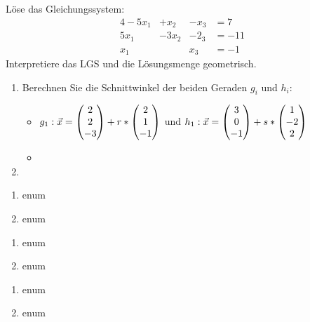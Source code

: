Löse das Gleichungssystem:
\begin{alignat*}{4}
	-5x_1& +x_2& -x_3& = 7\\
	5x_1&  -3x_2& -2_3& = -11\\
	x_1& & x_3& =-1
\end{alignat*}
Interpretiere das LGS und die Lösungsmenge geometrisch.



\begin{enumerate}
	\item Berechnen Sie die Schnittwinkel der beiden Geraden $g_i$ und $h_i$:
	\begin{itemize}
		\item $g_1: \vec x = \begin{pmatrix} 2\\2\\-3 \end{pmatrix} + r*\begin{pmatrix} 2\\1\\-1 \end{pmatrix}$ und $h_1: \vec x = \begin{pmatrix} 3\\0\\-1 \end{pmatrix} + s* \begin{pmatrix} 1\\-2\\2 \end{pmatrix}$
		\item
	\end{itemize}
	\item
\end{enumerate}

\begin{enumerate}
	\item enum
	\item	enum
\end{enumerate}

\begin{enumerate}
	\item enum
	\item	enum
\end{enumerate}


\begin{enumerate}
	\item enum
	\item	enum
\end{enumerate}



